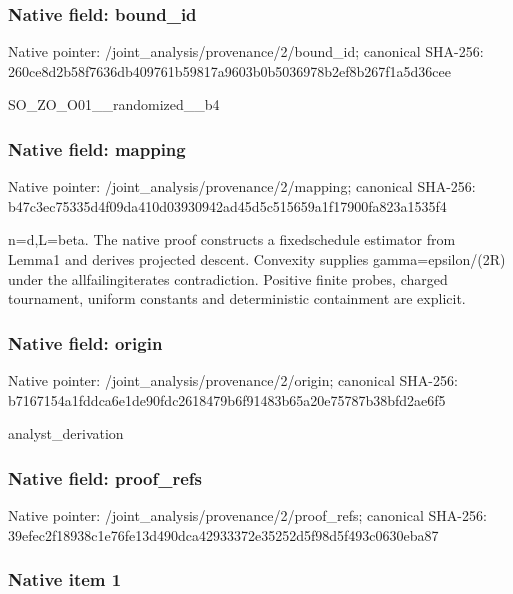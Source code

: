 \documentclass[10pt,a4paper]{article}
\begin{document}
\subsubsection{Native field: bound\_id}


Native pointer: /joint\_analysis/provenance/2/bound\_id; canonical SHA-256: 260ce8d2b58f7636db409761\allowbreak{}b59817a9603b0b5036978b2e\allowbreak{}f8b267f1a5d36cee


SO\_ZO\_O01\_\_randomized\_\_b4


\subsubsection{Native field: mapping}


Native pointer: /joint\_analysis/provenance/2/mapping; canonical SHA-256: b47c3ec75335d4f09da410d0\allowbreak{}3930942ad45d5c515659a1f1\allowbreak{}7900fa823a1535f4


n=d,L=beta. The native proof constructs a fixedschedule estimator from Lemma1 and derives projected descent. Convexity supplies gamma=epsilon/(2R) under the allfailingiterates contradiction. Positive finite probes, charged tournament, uniform constants and deterministic containment are explicit.


\subsubsection{Native field: origin}


Native pointer: /joint\_analysis/provenance/2/origin; canonical SHA-256: b7167154a1fddca6e1de90fd\allowbreak{}c2618479b6f91483b65a20e7\allowbreak{}5787b38bfd2ae6f5


analyst\_derivation


\subsubsection{Native field: proof\_refs}


Native pointer: /joint\_analysis/provenance/2/proof\_refs; canonical SHA-256: 39efec2f18938c1e76fe13d4\allowbreak{}90dca42933372e35252d5f98\allowbreak{}d5f493c0630eba87



\subsubsection{Native item 1}
\end{document}
